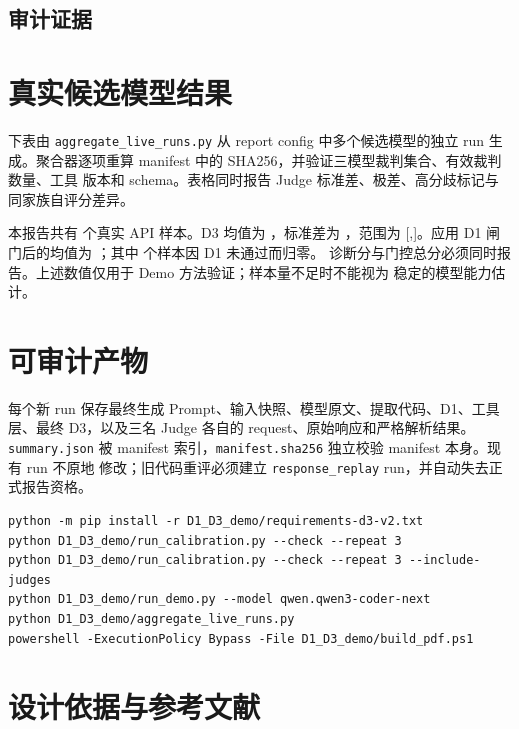 \documentclass[UTF8,zihao=-4,fontset=fandol]{ctexart}
\begin{document}
\subsection{审计证据}



\section{真实候选模型结果}

下表由 \texttt{aggregate\_live\_runs.py} 从 report config 中多个候选模型的独立 run
生成。聚合器逐项重算 manifest 中的 SHA256，并验证三模型裁判集合、有效裁判数量、工具
版本和 schema。表格同时报告 Judge 标准差、极差、高分歧标记与同家族自评分差异。



本报告共有 \LiveRunCount 个真实 API 样本。D3 均值为 \LiveDThreeMean，标准差为
\LiveDThreeStd，范围为 [\LiveDThreeMin,\LiveDThreeMax]。应用 D1 闸门后的均值为
\LiveGatedFinalMean；其中 \LiveDOneZeroedCount 个样本因 D1 未通过而归零。
诊断分与门控总分必须同时报告。上述数值仅用于 Demo 方法验证；样本量不足时不能视为
稳定的模型能力估计。

\section{可审计产物}

每个新 run 保存最终生成 Prompt、输入快照、模型原文、提取代码、D1、工具层、最终
D3，以及三名 Judge 各自的 request、原始响应和严格解析结果。\texttt{summary.json}
被 manifest 索引，\texttt{manifest.sha256} 独立校验 manifest 本身。现有 run 不原地
修改；旧代码重评必须建立 \texttt{response\_replay} run，并自动失去正式报告资格。

\begin{lstlisting}[language={}]
python -m pip install -r D1_D3_demo/requirements-d3-v2.txt
python D1_D3_demo/run_calibration.py --check --repeat 3
python D1_D3_demo/run_calibration.py --check --repeat 3 --include-judges
python D1_D3_demo/run_demo.py --model qwen.qwen3-coder-next
python D1_D3_demo/aggregate_live_runs.py
powershell -ExecutionPolicy Bypass -File D1_D3_demo/build_pdf.ps1
\end{lstlisting}

\section{设计依据与参考文献}
\end{document}
